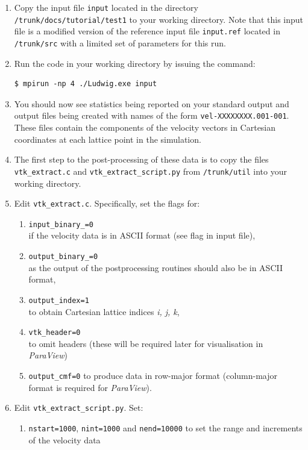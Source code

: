 \documentclass[11pt,twoside,a4paper]{article}
\begin{document}
\begin{enumerate}
\item Copy the input file \texttt{input} located in the directory \texttt{/trunk/docs/tutorial/test1} 
to your working directory. Note that this input file is a modified version of the 
reference input file \texttt{input.ref} located in \texttt{/trunk/src} with a limited set of parameters
for this run. 
\item Run the code in your working directory by issuing the command:
\begin{lstlisting}
$ mpirun -np 4 ./Ludwig.exe input
\end{lstlisting}
\item You should now see statistics being reported on your standard output and 
output files being created with names of the form \texttt{vel-XXXXXXXX.001-001}. 
These files contain the components of the velocity vectors in Cartesian coordinates at each lattice point in the simulation. 
\item The first step to the post-processing of these data is to copy the files \texttt{vtk\_extract.c} 
and \texttt{vtk\_extract\_script.py} from \texttt{/trunk/util} into your working directory.
\item Edit \texttt{vtk\_extract.c}. Specifically, set the flags for:
\begin{enumerate}
\item \texttt{input\_binary\_=0} \\ if the velocity data is in ASCII format (see flag in input file),
\item \texttt{output\_binary\_=0} \\ as the output of the postprocessing routines should also be in ASCII format,
\item \texttt{output\_index=1} \\ to obtain Cartesian lattice indices \textit{i, j, k}, 
\item \texttt{vtk\_header=0} \\ to omit headers (these will be required later for visualisation in \textit{ParaView})
\item \texttt{output\_cmf=0} to produce data in row-major format (column-major format is required for \textit{ParaView}).
\end{enumerate}
\item Edit \texttt{vtk\_extract\_script.py}. Set:
\begin{enumerate}
\item \texttt{nstart=1000}, \texttt{nint=1000} and \texttt{nend=10000} to set the range and increments of the velocity data

\end{enumerate}
\end{enumerate}
\end{document}

